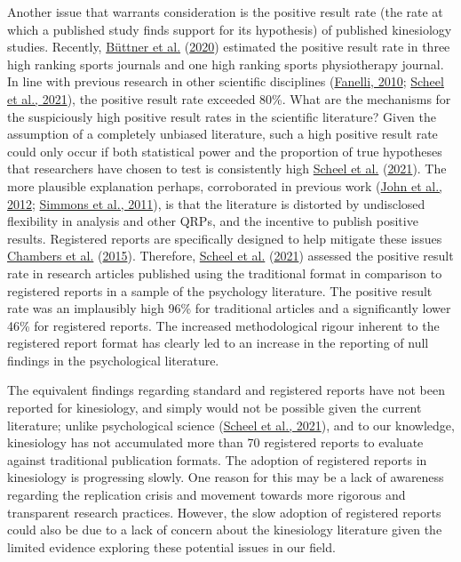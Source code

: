 \documentclass[]{cik}%
\begin{document}
Another issue that warrants consideration is the positive result rate
(the rate at which a published study finds support for its hypothesis)
of published kinesiology studies. Recently,
\protect\hyperlink{ref-buttner_2020}{Büttner et al.}
(\protect\hyperlink{ref-buttner_2020}{2020}) estimated the positive
result rate in three high ranking sports journals and one high ranking
sports physiotherapy journal. In line with previous research in other
scientific disciplines
(\protect\hyperlink{ref-fanelli_positive_2010}{Fanelli, 2010};
\protect\hyperlink{ref-scheel_excess_2020}{Scheel et al., 2021}), the
positive result rate exceeded 80\%. What are the mechanisms for the
suspiciously high positive result rates in the scientific literature?
Given the assumption of a completely unbiased literature, such a high
positive result rate could only occur if both statistical power and the
proportion of true hypotheses that researchers have chosen to test is
consistently high \protect\hyperlink{ref-scheel_excess_2020}{Scheel et
al.} (\protect\hyperlink{ref-scheel_excess_2020}{2021}). The more
plausible explanation perhaps, corroborated in previous work
(\protect\hyperlink{ref-John_Loewenstein_Prelec_2012}{John et al.,
2012}; \protect\hyperlink{ref-simmons_false-positive_2011}{Simmons et
al., 2011}), is that the literature is distorted by undisclosed
flexibility in analysis and other QRPs, and the incentive to publish
positive results. Registered reports are specifically designed to help
mitigate these issues
\protect\hyperlink{ref-chambers_registered_2015}{Chambers et al.}
(\protect\hyperlink{ref-chambers_registered_2015}{2015}). Therefore,
\protect\hyperlink{ref-scheel_excess_2020}{Scheel et al.}
(\protect\hyperlink{ref-scheel_excess_2020}{2021}) assessed the positive
result rate in research articles published using the traditional format
in comparison to registered reports in a sample of the psychology
literature. The positive result rate was an implausibly high 96\% for
traditional articles and a significantly lower 46\% for registered
reports. The increased methodological rigour inherent to the registered
report format has clearly led to an increase in the reporting of null
findings in the psychological literature.

The equivalent findings regarding standard and registered reports have
not been reported for kinesiology, and simply would not be possible
given the current literature; unlike psychological science
(\protect\hyperlink{ref-scheel_excess_2020}{Scheel et al., 2021}), and
to our knowledge, kinesiology has not accumulated more than 70
registered reports to evaluate against traditional publication formats.
The adoption of registered reports in kinesiology is progressing slowly.
One reason for this may be a lack of awareness regarding the replication
crisis and movement towards more rigorous and transparent research
practices. However, the slow adoption of registered reports could also
be due to a lack of concern about the kinesiology literature given the
limited evidence exploring these potential issues in our field.
\end{document}
